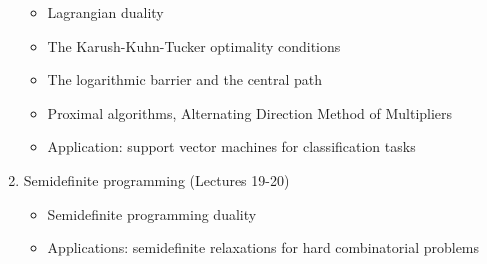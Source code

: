 \documentclass[11pt,a4paper]{memoir}
\begin{document}
\begin{enumerate}
\begin{itemize}
\item Lagrangian duality
\item The Karush-Kuhn-Tucker optimality conditions
\item The logarithmic barrier and the central path
\item Proximal algorithms, Alternating Direction Method of Multipliers
\item Application: support vector machines for classification tasks
\end{itemize}
\item Semidefinite programming (Lectures 19-20)
\begin{itemize}
\item Semidefinite programming duality
\item Applications: semidefinite relaxations for hard combinatorial problems
\end{itemize}
\end{enumerate}

\newpage
\end{document}
